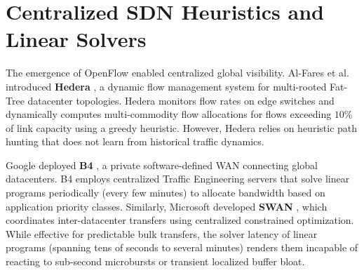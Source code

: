 \documentclass[12pt,a4paper,oneside]{report}
\begin{document}
\section{Centralized SDN Heuristics and Linear Solvers}
The emergence of OpenFlow \cite{lanzisera2010openflow} enabled centralized global visibility. Al-Fares et al. introduced \textbf{Hedera} \cite{al2010hedera}, a dynamic flow management system for multi-rooted Fat-Tree datacenter topologies. Hedera monitors flow rates on edge switches and dynamically computes multi-commodity flow allocations for flows exceeding $10\%$ of link capacity using a greedy heuristic. However, Hedera relies on heuristic path hunting that does not learn from historical traffic dynamics.

Google deployed \textbf{B4} \cite{jain2013b4}, a private software-defined WAN connecting global datacenters. B4 employs centralized Traffic Engineering servers that solve linear programs periodically (every few minutes) to allocate bandwidth based on application priority classes. Similarly, Microsoft developed \textbf{SWAN} \cite{hong2013achieving}, which coordinates inter-datacenter transfers using centralized constrained optimization. While effective for predictable bulk transfers, the solver latency of linear programs (spanning tens of seconds to several minutes) renders them incapable of reacting to sub-second microbursts or transient localized buffer bloat.
\end{document}
